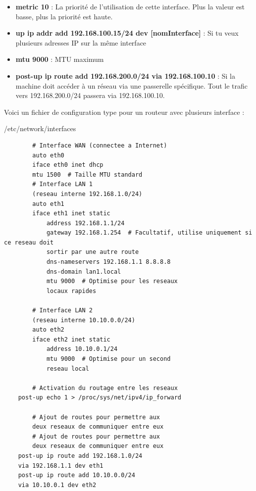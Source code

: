 \documentclass{article}
\begin{document}
\begin{itemize}
\begin{itemize}
        \item \textbf{metric 10} : La priorité de l'utilisation de cette interface. Plus la valeur est basse, plus la priorité est haute.
        \item \textbf{up ip addr add 192.168.100.15/24 dev [nomInterface]} : Si tu veux plusieurs adresses IP sur la même interface
        \item \textbf{mtu 9000} : MTU maximum
        \item \textbf{post-up ip route add 192.168.200.0/24 via 192.168.100.10} : Si la machine doit accéder à un réseau via une passerelle spécifique. Tout le trafic vers 192.168.200.0/24 passera via 192.168.100.10.
    \end{itemize}
\end{itemize}

Voici un fichier de configuration type pour un routeur avec plusieurs interface :

\begin{configbox}{/etc/network/interfaces}
    \begin{lstlisting}
        # Interface WAN (connectee a Internet)
        auto eth0
        iface eth0 inet dhcp
        mtu 1500  # Taille MTU standard
        # Interface LAN 1 
        (reseau interne 192.168.1.0/24)
        auto eth1
        iface eth1 inet static
            address 192.168.1.1/24
            gateway 192.168.1.254  # Facultatif, utilise uniquement si ce reseau doit 
            sortir par une autre route
            dns-nameservers 192.168.1.1 8.8.8.8
            dns-domain lan1.local
            mtu 9000  # Optimise pour les reseaux 
            locaux rapides

        # Interface LAN 2 
        (reseau interne 10.10.0.0/24)
        auto eth2
        iface eth2 inet static
            address 10.10.0.1/24
            mtu 9000  # Optimise pour un second 
            reseau local

        # Activation du routage entre les reseaux
    post-up echo 1 > /proc/sys/net/ipv4/ip_forward

        # Ajout de routes pour permettre aux 
        deux reseaux de communiquer entre eux
        # Ajout de routes pour permettre aux 
        deux reseaux de communiquer entre eux
    post-up ip route add 192.168.1.0/24 
    via 192.168.1.1 dev eth1
    post-up ip route add 10.10.0.0/24 
    via 10.10.0.1 dev eth2
    \end{lstlisting}
\end{configbox}
\end{document}
